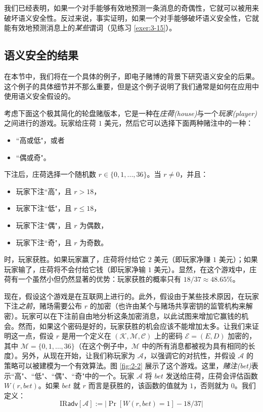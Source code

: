 我们已经表明，如果一个对手能够有效地预测一条消息的奇偶性，它就可以被用来破坏语义安全性。反过来说，事实证明，如果一个对手能够破坏语义安全性，它就能有效地预测消息上的\emph{某些}谓词（见练习 \ref{exer:3-15}）。

\subsection{语义安全的结果}\label{subsec:2-2-4}

在本节中，我们将在一个具体的例子，即电子赌博的背景下研究语义安全的后果。这个例子的具体细节并不那么重要，但是这个例子说明了我们通常是如何在应用中使用语义安全假设的。

考虑下面这个极其简化的轮盘赌版本，它是一种在\emph{庄荷(house)}与一个\emph{玩家(player)}之间进行的游戏。玩家给庄荷 $1$ 美元，然后它可以选择下面两种赌注中的一种：
\begin{itemize}
	\item ``高或低"，或者
	\item ``偶或奇"。
\end{itemize}
下注后，庄荷选择一个随机数 $r\in\{0,1,...,36\}$。当 $r\neq 0$，并且：
\begin{itemize}
	\item 玩家下注``高"，且 $r>18$，
	\item 玩家下注``低"，且 $r\leq18$，
	\item 玩家下注``偶"，且 $r$ 为偶数，
	\item 玩家下注``奇"，且 $r$ 为奇数。
\end{itemize}
时，玩家获胜。如果玩家赢了，庄荷将付给它 $2$ 美元（即玩家净赚 $1$ 美元）；如果玩家输了，庄荷将不会付给它钱（即玩家净输 $1$ 美元）。显然，在这个游戏中，庄荷有一个虽然小但仍然显著的优势：玩家获胜的概率只有 $18/37\approx48.65\%$。

现在，假设这个游戏是在互联网上进行的。此外，假设由于某些技术原因，在玩家下注\emph{之前}，赌场需要公布 $r$ 的加密（也许由某个与赌场共享密钥的监管机构来解密）。玩家可以在下注前自由地分析这条加密消息，以此试图来增加它赢钱的机会。然而，如果这个密码是好的，玩家获胜的机会应该不能增加太多。让我们来证明这一点，假设 $r$ 是用一个定义在 $(\mathcal{K},\mathcal{M},\mathcal{C})$ 上的密码 $\mathcal{E}=(E,D)$ 加密的，其中 $\mathcal{M}=\{0,1,\dots,36\}$（在这个例子中，$\mathcal{M}$ 中的所有消息都被视为具有相同的长度）。另外，从现在开始，让我们称玩家为 $\mathcal{A}$，以强调它的对抗性，并假设 $\mathcal{A}$ 的策略可以被建模为一个有效算法。图 \ref{fig:2-2} 展示了这个游戏。这里，\emph{赌注(bet)}表示``高"、``低"、``偶"、``奇"中的一个。玩家 $\mathcal{A}$ 将 $\mathit{bet}$ 发送给庄荷，庄荷会评估函数 $W(r,\mathit{bet})$。如果 $\mathit{bet}$ 就 $r$ 而言是获胜的，该函数的值就为 $1$，否则就为 $0$。我们定义：
\[
\mathrm{IR}\mathsf{adv}[\mathcal{A}]
:=
\big\lvert
\Pr[W(r,bet)=1]-18/37
\big\rvert
\]

